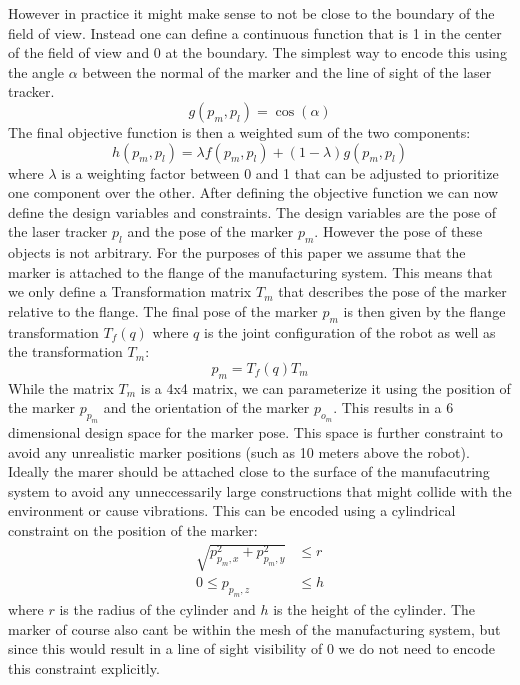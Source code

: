\documentclass{svproc}
\begin{document}
However in practice it might make sense to not be close to the boundary of the field of view.
Instead one can define a continuous function that is 1 in the center of the field of view and 0 at the boundary.
The simplest way to encode this using the angle $\alpha$ between the normal of the marker and the line of sight of the laser tracker.
\begin{equation}
    g(p_m,p_l) = \cos(\alpha)
\end{equation}
The final objective function is then a weighted sum of the two components:
\begin{equation}
    h(p_m,p_l) = \lambda f(p_m,p_l) + (1-\lambda) g(p_m,p_l)
    \label{eq:objective}
\end{equation}
where $\lambda$ is a weighting factor between 0 and 1 that can be adjusted to prioritize one component over the other.
After defining the objective function we can now define the design variables and constraints.
The design variables are the pose of the laser tracker $p_l$ and the pose of the marker $p_m$.
However the pose of these objects is not arbitrary.
For the purposes of this paper we assume that the marker is attached to the flange of the manufacturing system.
This means that we only define a Transformation matrix $T_{m}$ that describes the pose of the marker relative to the flange.
The final pose of the marker $p_m$ is then given by the flange transformation $T_{f}(q)$ where $q$ is the joint configuration of the robot as well as the transformation $T_{m}$:
\begin{equation}
    p_m = T_{f}(q)T_{m}
\end{equation}
While the matrix $T_m$ is a 4x4 matrix, we can parameterize it using the position of the marker $p_{p_m}$ and the orientation of the marker $p_{o_m}$.
This results in a 6 dimensional design space for the marker pose.
This space is further constraint to avoid any unrealistic marker positions (such as 10 meters above the robot).
Ideally the marer should be attached close to the surface of the manufacutring system to avoid any unneccessarily large constructions that might collide with the environment or cause vibrations.
This can be encoded using a cylindrical constraint on the position of the marker:
\begin{equation}
        \begin{split}
    \sqrt{p_{p_m,x}^2 + p_{p_m,y}^2} &\leq r \\
        0 \leq p_{p_m,z} &\leq h
        \end{split}
\end{equation}
where $r$ is the radius of the cylinder and $h$ is the height of the cylinder.
The marker of course also cant be within the mesh of the manufacturing system, but since this would result in a line of sight visibility of 0 we do not need to encode this constraint explicitly.
\end{document}
